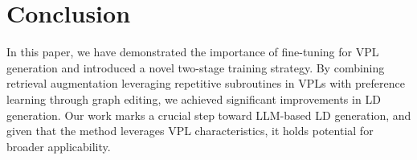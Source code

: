 \section{Conclusion}
In this paper, we have demonstrated the importance of fine-tuning for VPL generation and introduced a novel two-stage training strategy. By combining retrieval augmentation leveraging repetitive subroutines in VPLs with preference learning through graph editing, we achieved significant improvements in LD generation. Our work marks a crucial step toward LLM-based LD generation, and given that the method leverages VPL characteristics, it holds potential for broader applicability. 
